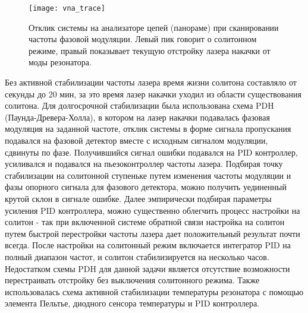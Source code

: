 \begin{figure}[ht]
\centering
  \texttt{[image: vna\_trace]}
  \caption{Отклик системы на анализаторе цепей (панораме) при сканировании частоты фазовой модуляции. Левый пик говорит о солитонном режиме, правый показывает текущую отстройку лазера накачки от моды резонатора.}
  \label{vna_trace}
\end{figure}


Без активной стабилизации частоты лазера время жизни солитона составляло от секунды до 20 мин, за это время лазер накачки уходил из области существования солитона. Для долгосрочной стабилизации была использована схема PDH (Паунда-Древера-Холла), в котором на лазер накачки подавалась фазовая модуляция на заданной частоте, отклик системы в форме сигнала пропускания подавался на фазовой детектор вместе с исходным сигналом модуляции, сдвинуты по фазе. Получившийся сигнал ошибки подавался на PID контроллер, усиливался и подавался на пьезоконтроллер частоты лазера. Подбирая точку стабилизации на солитонной ступеньке путем изменения частоты модуляции и фазы опорного сигнала для фазового детектора, можно получить уединенный крутой склон в сигнале ошибке. Далее эмпирически подбирая параметры усиления PID контроллера, можно существенно облегчить процесс настройки на солитон - так при включенной системе обратной связи настройка на солитон путем быстрой перестройки частоты лазера дает положительный результат почти всегда. После настройки на солитонный режим включается интегратор PID на полный диапазон частот, и солитон стабилизируется на несколько часов. Недостатком схемы PDH для данной задачи является отсутствие возможности перестраивать отстройку без выключения солитонного режима. Также использовалась схема активной стабилизации температуры резонатора с помощью элемента Пельтье, диодного сенсора температуры и PID контроллера.


